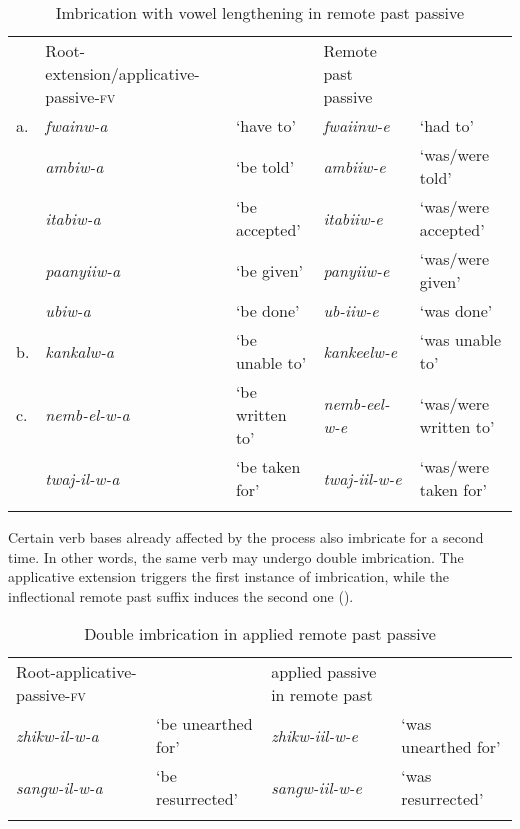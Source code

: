 \documentclass[output=paper]{langsci/langscibook}
\begin{document}
\begin{table}
\begin{tabular}{lllll}
\lsptoprule
 & Root-extension/applicative-passive-\textsc{fv} &  & Remote past passive & \\
a. & \textit{fwainw-a} & `have to' & \textit{fwaiinw-e} & `had to' \\
 & \textit{ambiw-a} & `be told' & \textit{ambiiw-e} & `was/were told' \\
 & \textit{itabiw-a} & `be accepted' & \textit{itabiiw-e} & `was/were accepted' \\
 & \textit{paanyiiw-a} & `be given' & \textit{panyiiw-e} & `was/were given' \\
 & \textit{ubiw-a} & `be done' & \textit{ub-iiw-e} & `was done' \\

b. & \textit{kankalw-a} & `be unable to' & \textit{kankeelw-e} & `was unable to' \\

c. & \textit{nemb-el-w-a} & `be written to' & \textit{nemb-eel-w-e} & `was/were written to' \\
 & \textit{twaj-il-w-a} & `be taken for' & \textit{twaj-iil-w-e} & `was/were taken for' \\

\lspbottomrule
\end{tabular}

\caption{Imbrication with vowel lengthening in remote past passive}
\label{tab:26.kawasha}

\end{table}

Certain verb bases already affected by the process also imbricate for a second time. In other words, the same verb may undergo double imbrication. The applicative extension triggers the first instance of imbrication, while the inflectional remote past suffix induces the second one ().

\begin{table}
\begin{tabular}{llll}
\lsptoprule
Root-applicative-passive-\textsc{fv} &  & applied passive in remote past & \\
\textit{zhikw-il-w-a} & `be unearthed for' & \textit{zhikw-iil-w-e} & `was unearthed for' \\
\textit{sangw-il-w-a} & `be resurrected' & \textit{sangw-iil-w-e} & `was resurrected' \\

\lspbottomrule
\end{tabular}

\caption{Double imbrication in applied remote past passive}
\label{tab:27.kawasha}

\end{table}
\end{document}
